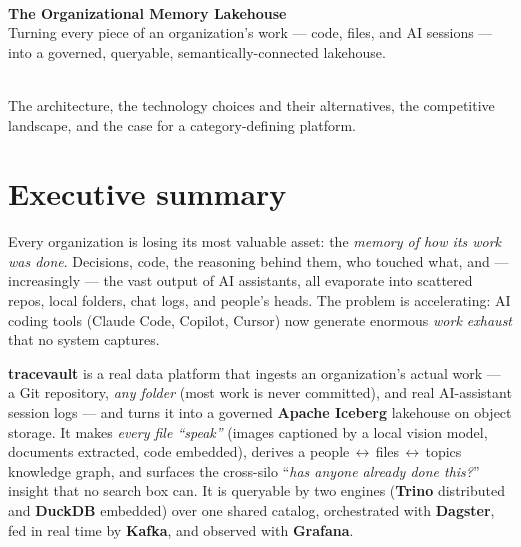 \documentclass[11pt]{article}
\newcommand{\kw}[1]{\textcolor{tvaccent}{\textbf{#1}}}
\begin{document}
\begin{titlepage}
\thispagestyle{empty}
\vspace*{1.2in}
\noindent{\color{tvrule}\rule{\linewidth}{1.5pt}}
\vspace{0.4in}

\\[0.25in]
{\Large\color{tvaccent}\bfseries The Organizational Memory Lakehouse}\\[0.15in]
{\large\color{tvmuted} Turning every piece of an organization's work --- code, files, and AI sessions ---\\ into a governed, queryable, semantically-connected lakehouse.}

\vspace{0.5in}
\noindent{\color{tvrule}\rule{\linewidth}{1.5pt}}
\vspace{0.3in}

\\[0.1in]
{\color{tvmuted} The architecture, the technology choices and their alternatives, the competitive\\ landscape, and the case for a category-defining platform.}

\vfill
{}
\end{titlepage}

\tableofcontents
\thispagestyle{empty}
\newpage

\section{Executive summary}

Every organization is losing its most valuable asset: the \emph{memory of how its work was done}.
Decisions, code, the reasoning behind them, who touched what, and --- increasingly --- the vast
output of AI assistants, all evaporate into scattered repos, local folders, chat logs, and
people's heads. The problem is accelerating: AI coding tools (Claude Code, Copilot, Cursor) now
generate enormous \emph{work exhaust} that no system captures.

\kw{tracevault} is a real data platform that ingests an organization's actual work --- a Git
repository, \emph{any folder} (most work is never committed), and real AI-assistant session logs ---
and turns it into a governed \kw{Apache Iceberg} lakehouse on object storage. It makes
\emph{every file ``speak''} (images captioned by a local vision model, documents extracted, code
embedded), derives a people\,$\leftrightarrow$\,files\,$\leftrightarrow$\,topics knowledge graph,
and surfaces the cross-silo ``\emph{has anyone already done this?}'' insight that no search box can.
It is queryable by two engines (\kw{Trino} distributed and \kw{DuckDB} embedded) over one shared
catalog, orchestrated with \kw{Dagster}, fed in real time by \kw{Kafka}, and observed with
\kw{Grafana}.
\end{document}
